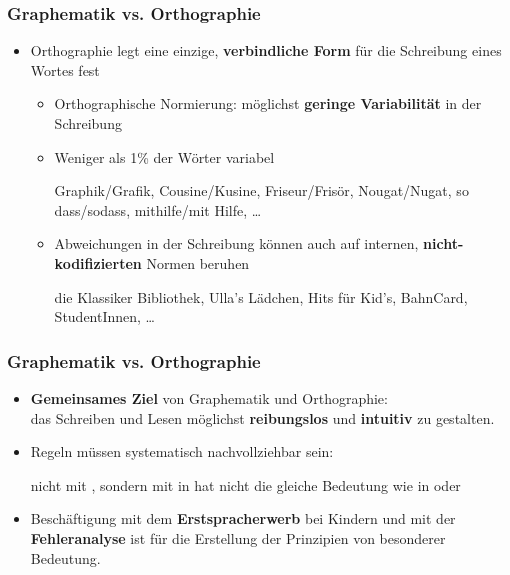 \begin{frame}
\frametitle{Graphematik vs. Orthographie}

\begin{itemize}
	\item Orthographie legt \idR eine einzige, \textbf{verbindliche Form} für die Schreibung eines Wortes fest
	
	\begin{itemize}
		\item Orthographische Normierung: möglichst \textbf{geringe Variabilität} in der Schreibung

\pause

		\item Weniger als 1\% der Wörter variabel
			
		\ea Graphik/Grafik, Cousine/Kusine, Friseur/Frisör, Nougat/Nugat, so dass/sodass, mithilfe/mit Hilfe, \dots
		\z

\pause 
			
		\item Abweichungen in der Schreibung können auch auf internen, \textbf{nicht-kodifizierten} Normen beruhen
			
		\ea die Klassiker Bibliothek, Ulla's Lädchen, Hits für Kid's, BahnCard, StudentInnen, \dots
		\z
	\end{itemize}
\end{itemize}

\end{frame}


\begin{frame}
\frametitle{Graphematik vs. Orthographie}

\begin{itemize}
	\item \textbf{Gemeinsames Ziel} von Graphematik und Orthographie:\\
	 das Schreiben und Lesen möglichst \textbf{reibungslos} und \textbf{intuitiv} zu gestalten.

	\item Regeln müssen systematisch nachvollziehbar sein:
	
	\ea {} nicht mit , sondern mit  \ras {} in  hat nicht die gleiche Bedeutung wie  in  oder 
	\z
	
	\item Beschäftigung mit dem \textbf{Erstspracherwerb} bei Kindern und mit der \textbf{Fehleranalyse} ist für die Erstellung der Prinzipien von besonderer Bedeutung.
\end{itemize}

\end{frame}


